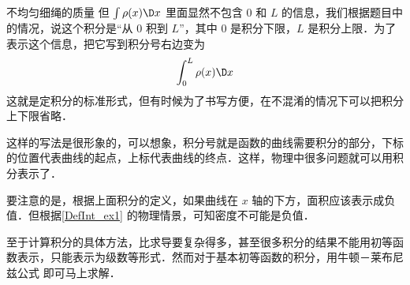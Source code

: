 \begin{exam}{不均匀细绳的质量}
但 $\int {\rho(x)\D x} $ 里面显然不包含 $0$ 和 $L$ 的信息，我们根据题目中的情况，说这个积分是“从 $0$ 积到 $L$”，其中 $0$ 是积分下限，$L$ 是积分上限．为了表示这个信息，把它写到积分号右边变为
\begin{equation}
\int_0^L {\rho(x)\D x} 
\end{equation}
这就是定积分的标准形式，但有时候为了书写方便，在不混淆的情况下可以把积分上下限省略．
\end{exam}

这样的写法是很形象的，可以想象，积分号就是函数的曲线需要积分的部分，下标的位置代表曲线的起点，上标代表曲线的终点．这样，物理中很多问题就可以用积分表示了．

要注意的是，根据上面积分的定义，如果曲线在 $x$ 轴的下方，面积应该表示成负值．但根据\autoref{DefInt_ex1} 的物理情景，可知密度不可能是负值．

至于计算积分的具体方法，比求导要复杂得多，甚至很多积分的结果不能用初等函数表示，只能表示为级数等形式．然而对于基本初等函数的积分，用牛顿－莱布尼兹公式 即可马上求解．

